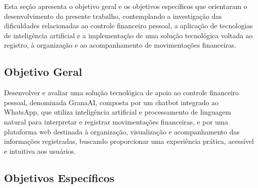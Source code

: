 Esta seção apresenta o objetivo geral e os objetivos específicos que orientaram o desenvolvimento do presente trabalho, contemplando a investigação das dificuldades relacionadas ao controle financeiro pessoal, a aplicação de tecnologias de inteligência artificial e a implementação de uma solução tecnológica voltada ao registro, à organização e ao acompanhamento de movimentações financeiras.

\subsection{Objetivo Geral}

Desenvolver e avaliar uma solução tecnológica de apoio ao controle financeiro pessoal, denominada GranaAI, composta por um chatbot integrado ao WhatsApp, que utiliza inteligência artificial e processamento de linguagem natural para interpretar e registrar movimentações financeiras, e por uma plataforma web destinada à organização, visualização e acompanhamento das informações registradas, buscando proporcionar uma experiência prática, acessível e intuitiva aos usuários.

\subsection{Objetivos Específicos}

